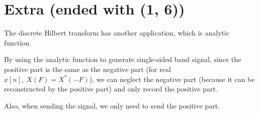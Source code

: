 \documentclass{article}
\begin{document}
\section*{Extra (ended with (1, 6))}

The discrete Hilbert transform has another application, which is analytic function.
\bigskip

By using the analytic function to generate single-sided band signal, since the positive part is the same as the negative part
(for real $x[n], \ X(F) = X^*(-F)$),
we can neglect the negative part (because it can be reconstructed by the positive part) and only record the positive part.
\bigskip

Also, when sending the signal, we only need to send the positive part.
\end{document}
